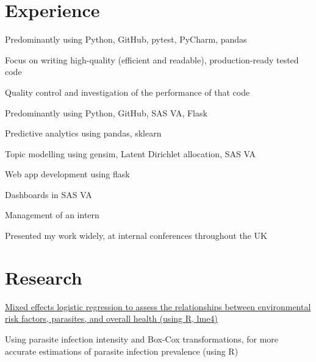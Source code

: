 \documentclass[]{cv}
\begin{document}
\hfill
\begin{minipage}[t]{0.66\textwidth} 


\section{Experience}
\vspace{\topsep} %
\begin{tightemize}
\item Predominantly using Python, GitHub, pytest, PyCharm, pandas
\item Focus on writing high-quality (efficient and readable), production-ready tested code
\item Quality control and investigation of the performance of that code
\end{tightemize}

\sectionsep

\begin{tightemize}
\item Predominantly using Python, GitHub, SAS VA, Flask
\item Predictive analytics using pandas, sklearn
\item Topic modelling using gensim, Latent Dirichlet allocation, SAS VA
\item Web app development using flask
\item Dashboards in SAS VA
\item Management of an intern
\item Presented my work widely, at internal conferences throughout the UK
\end{tightemize}
\sectionsep


\section{Research}
\begin{tightemize}
\item {\href{https://journals.plos.org/plosntds/article?id=10.1371/journal.pntd.0005948}{Mixed effects logistic regression to assess the relationships between environmental risk factors, parasites, and overall health (using R, lme4)}}
\item Using parasite infection intensity and Box-Cox transformations, for more accurate estimations of parasite infection prevalence (using R)
\end{tightemize}
\sectionsep



\end{minipage}
\end{document}
